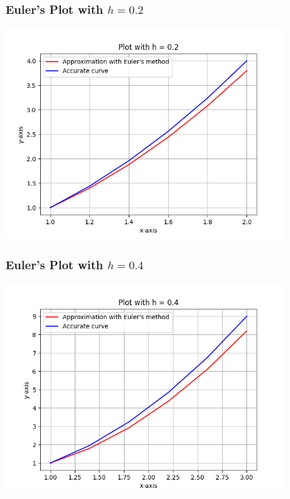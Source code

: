 \documentclass{beamer}
\begin{document}
\begin{frame}
  \frametitle{Euler's Plot with $h = 0.2$}
  \begin{center}
    \includegraphics[width=0.8\textwidth]{Euler_02.png}
  \end{center}
\end{frame}

\begin{frame}
  \frametitle{Euler's Plot with $h = 0.4$}
  \begin{center}
    \includegraphics[width=0.8\textwidth]{Euler_04.png}
  \end{center}
\end{frame}
\end{document}
